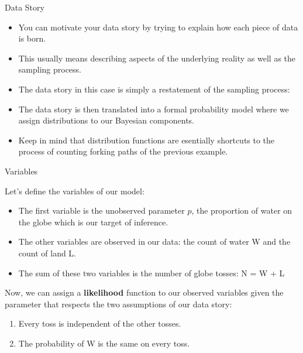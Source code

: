 \documentclass[handout]{beamer}
\begin{document}
\begin{frame}{Data Story}
\scriptsize{
\begin{itemize}
\item You can motivate your data story by trying to explain how each piece of data is born. 
\item This usually means describing aspects of the underlying reality as well as the sampling process.
\item The data story in this case is simply a restatement of the sampling process:


\item The data story is then translated into a formal probability model where we assign distributions to our Bayesian components.
\item Keep in mind that distribution functions are esentially shortcuts to the process of counting forking paths of the previous example.
\end{itemize}




} 
 
 

\end{frame}


\begin{frame}{Variables}
\scriptsize{
Let's define the variables of our model:
\begin{itemize}
\item The first variable is the unobserved parameter $p$, the proportion of water on the globe which is our target of inference.
\item The other variables are observed in our data: the count of water W and the count of land L. 
\item The sum of these two variables is the number of globe tosses: N = W + L
\end{itemize}
Now, we can assign a \textbf{likelihood} function  to our observed variables given the parameter that respects the two assumptions of our data story:
\begin{enumerate}
 \item  Every toss is independent of the other tosses.
 \item The probability of W is the same on every toss.
\end{enumerate}
} 
 
 

\end{frame}
\end{document}
